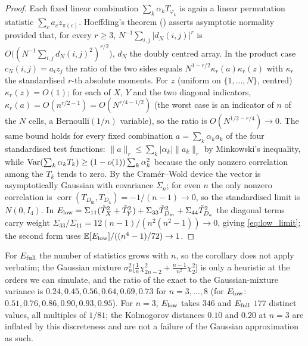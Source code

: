 \begin{proof}
Each fixed linear combination $\sum_k\alpha_kT_{\varphi_k}$ is again a linear permutation statistic $\sum_c a_c z_{\pi(c)}$.
Hoeffding's theorem \cite[Thm.~3]{hoeffding1951} () asserts asymptotic normality provided that, for every
$r\ge3$, $N^{-1}\sum_{i,j}|d_N(i,j)|^r$ is $O\bigl((N^{-1}\sum_{i,j}d_N(i,j)^2)^{r/2}\bigr)$, $d_N$ the doubly centred array.
In the product case $c_N(i,j)=a_iz_j$ the ratio of the two sides equals $N^{1-r/2}\kappa_r(a)\kappa_r(z)$ with $\kappa_r$ the
standardised $r$-th absolute moments.  For $z$ (uniform on $\{1,\dots,N\}$, centred) $\kappa_r(z)=O(1)$; for each of $X$, $Y$
and the two diagonal indicators, $\kappa_r(a)=O(n^{r/2-1})=O(N^{r/4-1/2})$ (the worst case is an indicator of $n$ of the
$N$ cells, a Bernoulli$(1/n)$ variable), so the ratio is $O(N^{1/2-r/4})\to0$.  The same bound holds for every fixed
combination $a=\sum_k\alpha_ka_k$ of the four standardised test functions: $\|a\|_r\le\sum_k|\alpha_k|\|a_k\|_r$ by
Minkowski's inequality, while $\mathrm{Var}(\sum_k\alpha_kT_k)\ge(1-o(1))\sum_k\alpha_k^2$ because the only nonzero correlation among
the $T_k$ tends to zero.  By the Cram\'er--Wold device the vector is asymptotically Gaussian with covariance $\Sigma_n$; for
even $n$ the only nonzero correlation is $\operatorname{corr}(T_{D_{\mathrm{m}}},T_{D_{\mathrm{a}}})=-1/(n-1)\to0$, so the
standardised limit is $N(0,I_4)$.  In $E_{\mathrm{low}}=\Sigma_{11}(\tilde T_X^2+\tilde T_Y^2)+\Sigma_{33}\tilde T_{D_m}^2+\Sigma_{44}\tilde T_{D_a}^2$
the diagonal terms carry weight $\Sigma_{33}/\Sigma_{11}=12(n-1)/(n^2(n^2-1))\to0$, giving \eqref{eq:low_limit}; the second
form uses $\mathbb{E}[E_{\mathrm{low}}]/((n^4-1)/72)\to1$.
\end{proof}

\begin{remark}
For $E_{\mathrm{full}}$ the number of statistics grows with $n$, so the corollary does not apply verbatim; the Gaussian mixture
$\sigma_n^2\big[\tfrac1n\chi^2_{2n-2}+\tfrac{n-1}{n^2}\chi^2_2\big]$ is only a heuristic at the orders we can simulate, and the
ratio of the exact to the Gaussian-mixture variance is $0.24, 0.45, 0.56, 0.64, 0.69, 0.73$ for $n=3,\dots,8$ (for $E_{\mathrm{low}}$:
$0.51, 0.76, 0.86, 0.90, 0.93, 0.95$).  For $n=3$, $E_{\mathrm{low}}$ takes $346$ and $E_{\mathrm{full}}$ $177$ distinct values, all multiples
of $1/81$; the Kolmogorov distances $0.10$ and $0.20$ at $n=3$ are inflated by this discreteness and are not a failure of the
Gaussian approximation as such.
\end{remark}

